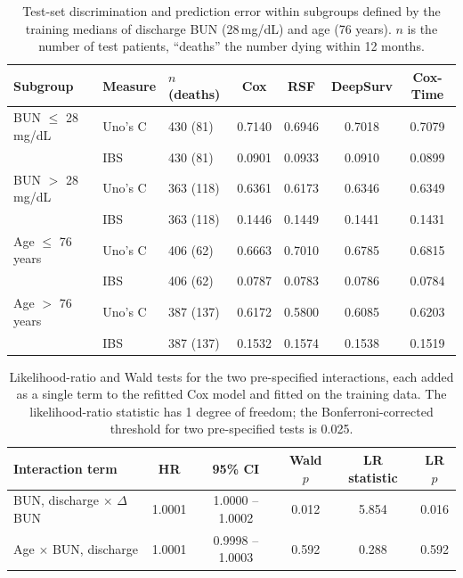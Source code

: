 \documentclass[11pt,a4paper]{article}
\newcommand{\dbun}{$\Delta$BUN}
\begin{document}
\begin{table}[H]
\centering
\caption{Test-set discrimination and prediction error within subgroups
defined by the training medians of discharge BUN (28\,mg/dL) and age (76 years). $n$ is the
number of test patients, ``deaths'' the number dying within 12 months.}
\label{tab:subgroup}
\vspace{0.3em}
\small
\begin{tabular}{lllcccc}
\toprule
Subgroup & Measure & $n$ (deaths) & Cox & RSF & DeepSurv & Cox-Time \\
\midrule
BUN $\le$ 28 mg/dL & Uno's C & 430 (81) & 0.7140 & 0.6946 & 0.7018 & 0.7079 \\
                   & IBS     & 430 (81) & 0.0901 & 0.0933 & 0.0910 & 0.0899 \\
\addlinespace
BUN $>$ 28 mg/dL   & Uno's C & 363 (118) & 0.6361 & 0.6173 & 0.6346 & 0.6349 \\
                   & IBS     & 363 (118) & 0.1446 & 0.1449 & 0.1441 & 0.1431 \\
\addlinespace
Age $\le$ 76 years & Uno's C & 406 (62) & 0.6663 & 0.7010 & 0.6785 & 0.6815 \\
                   & IBS     & 406 (62) & 0.0787 & 0.0783 & 0.0786 & 0.0784 \\
\addlinespace
Age $>$ 76 years   & Uno's C & 387 (137) & 0.6172 & 0.5800 & 0.6085 & 0.6203 \\
                   & IBS     & 387 (137) & 0.1532 & 0.1574 & 0.1538 & 0.1519 \\
\bottomrule
\end{tabular}
\end{table}

\begin{table}[H]
\centering
\caption{Likelihood-ratio and Wald tests for the two pre-specified
interactions, each added as a single term to the refitted Cox model and fitted on the
training data. The likelihood-ratio statistic has 1 degree of freedom; the
Bonferroni-corrected threshold for two pre-specified tests is 0.025.}
\label{tab:interactions}
\vspace{0.3em}
\small
\begin{tabular}{lccccc}
\toprule
Interaction term & HR & 95\% CI & Wald $p$ & LR statistic & LR $p$ \\
\midrule
BUN, discharge $\times$ \dbun{} & 1.0001 & 1.0000 -- 1.0002 & 0.012 & 5.854 & 0.016 \\
Age $\times$ BUN, discharge     & 1.0001 & 0.9998 -- 1.0003 & 0.592 & 0.288 & 0.592 \\
\bottomrule
\end{tabular}
\end{table}
\end{document}
